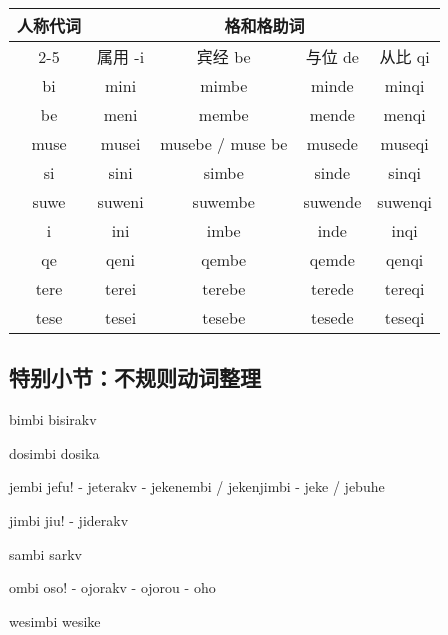 \begin{center}
    \begin{tabular}{c|c|c|c|c}
        \toprule
        \multirow{3}{*}{人称代词} & \multicolumn{4}{c}{格和格助词} \\
        \cline{2-5}
            & 属用 -i & 宾经 be & 与位 de & 从比 qi\\
        \midrule
        bi & mini & mimbe & minde & minqi \\
        be & meni & membe & mende & menqi \\
        \hline
        muse & musei & musebe / muse be & musede & museqi \\
        \hline
        si & sini & simbe & sinde & sinqi \\
        suwe & suweni & suwembe & suwende & suwenqi \\
        \hline
        i & ini & imbe & inde & inqi \\
        qe & qeni & qembe & qemde & qenqi \\
        \hline
        tere & terei & terebe & terede & tereqi \\
        tese & tesei & tesebe & tesede & teseqi \\
        \bottomrule
    \end{tabular}
\end{center}

\subsection{特别小节：不规则动词整理}

\begin{des}
    \item[bimbi] bisirakv 
    \item[dosimbi] dosika 
    \item[jembi] jefu! - jeterakv - jekenembi / jekenjimbi - jeke / jebuhe
    \item[jimbi] jiu! - jiderakv
    \item[sambi] sarkv 
    \item[ombi] oso! - ojorakv - ojorou - oho
    \item[wesimbi] wesike 
\end{des}